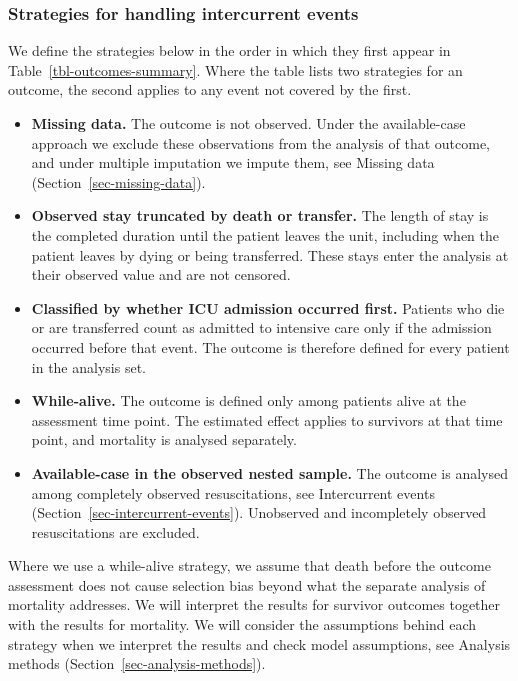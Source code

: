 \documentclass[
]{scrartcl}
\providecommand{\tightlist}{%
  \setlength{\itemsep}{0pt}\setlength{\parskip}{0pt}}\usepackage{longtable,booktabs,array}
\begin{document}
\subsubsection{Strategies for handling intercurrent
events}\label{sec-strategies-for-handling-intercurrent-events}

We define the strategies below in the order in which they first appear
in Table~\ref{tbl-outcomes-summary}. Where the table lists two
strategies for an outcome, the second applies to any event not covered
by the first.

\begin{itemize}
\tightlist
\item
  \textbf{Missing data.} The outcome is not observed. Under the
  available-case approach we exclude these observations from the
  analysis of that outcome, and under multiple imputation we impute
  them, see Missing data (Section~\ref{sec-missing-data}).
\item
  \textbf{Observed stay truncated by death or transfer.} The length of
  stay is the completed duration until the patient leaves the unit,
  including when the patient leaves by dying or being transferred. These
  stays enter the analysis at their observed value and are not censored.
\item
  \textbf{Classified by whether ICU admission occurred first.} Patients
  who die or are transferred count as admitted to intensive care only if
  the admission occurred before that event. The outcome is therefore
  defined for every patient in the analysis set.
\item
  \textbf{While-alive.} The outcome is defined only among patients alive
  at the assessment time point. The estimated effect applies to
  survivors at that time point, and mortality is analysed separately.
\item
  \textbf{Available-case in the observed nested sample.} The outcome is
  analysed among completely observed resuscitations, see
  Intercurrent events (Section~\ref{sec-intercurrent-events}).
  Unobserved and incompletely observed resuscitations are excluded.
\end{itemize}

Where we use a while-alive strategy, we assume that death before the
outcome assessment does not cause selection bias beyond what the
separate analysis of mortality addresses. We will interpret the results
for survivor outcomes together with the results for mortality. We will
consider the assumptions behind each strategy when we interpret the
results and check model assumptions, see Analysis methods
(Section~\ref{sec-analysis-methods}).
\end{document}
